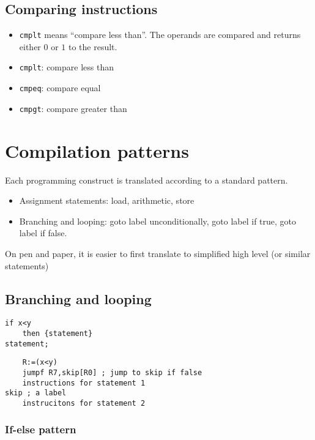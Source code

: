 \subsection{Comparing instructions}\label{sub:comparing_instructions}

\begin{itemize}
	\item \texttt{cmplt} means ``compare less than''.
	      The operands are compared and returns either \(0\) or \(1\) to the result.
	\item \texttt{cmplt}: compare less than
	\item \texttt{cmpeq}: compare equal
	\item \texttt{cmpgt}: compare greater than
\end{itemize}

\section{Compilation patterns}\label{sec:compilation_patterns}

Each programming construct is translated according to a standard pattern.

\begin{itemize}
	\item Assignment statements: load, arithmetic, store
	\item Branching and looping: goto label unconditionally, goto label if true, goto label if false.
\end{itemize}
On pen and paper, it is easier to first translate to simplified high level (or similar statements)

\subsection{Branching and looping}\label{sub:branching_and_looping}

\begin{verbatim}
if x<y
    then {statement}
statement;
\end{verbatim}

\begin{verbatim}
    R:=(x<y)
    jumpf R7,skip[R0] ; jump to skip if false
    instructions for statement 1
skip ; a label
    instrucitons for statement 2
\end{verbatim}

\subsubsection{If-else pattern}\label{ssub:if_else_pattern}

